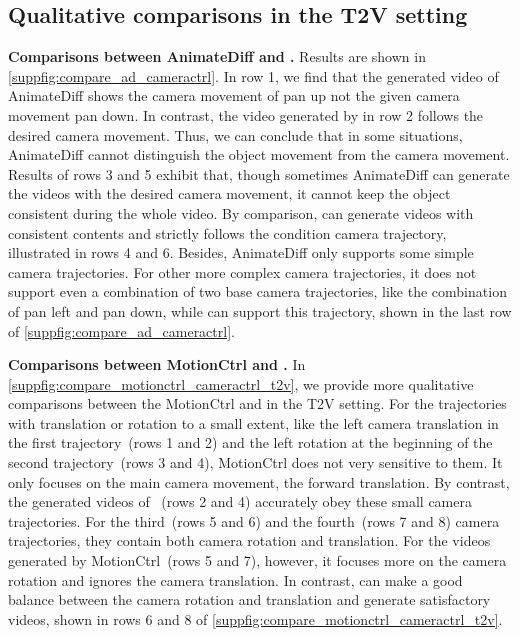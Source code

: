 \subsection{Qualitative comparisons in the T2V setting}
\label{suppsubsec:visual_comparison_t2v}
\noindent \textbf{Comparisons between AnimateDiff and \method.} Results are shown in \cref{suppfig:compare_ad_cameractrl}.
%
In row 1, we find that the generated video of AnimateDiff shows the camera movement of pan up not the given camera movement pan down.
%
In contrast, the video generated by \method in row 2 follows the desired camera movement.
%
Thus, we can conclude that in some situations, AnimateDiff cannot distinguish the object movement from the camera movement.
%
Results of rows 3 and 5 exhibit that, though sometimes AnimateDiff can generate the videos with the desired camera movement, it cannot keep the object consistent during the whole video.
%
By comparison, \method can generate videos with consistent contents and strictly follows the condition camera trajectory, illustrated in rows 4 and 6.
%
Besides, AnimateDiff only supports some simple camera trajectories.
%
For other more complex camera trajectories, it does not support even a combination of two base camera trajectories, like the combination of pan left and pan down, while \method can support this trajectory, shown in the last row of \cref{suppfig:compare_ad_cameractrl}.

\noindent\textbf{Comparisons between MotionCtrl and \method.} In \cref{suppfig:compare_motionctrl_cameractrl_t2v}, we provide more qualitative comparisons between the MotionCtrl and \method in the T2V setting. 
%
For the trajectories with translation or rotation to a small extent, like the left camera translation in the first trajectory~(rows 1 and 2) and the left rotation at the beginning of the second trajectory~(rows 3 and 4), MotionCtrl does not very sensitive to them.
%
It only focuses on the main camera movement, the forward translation.
%
By contrast, the generated videos of \method~(rows 2 and 4) accurately obey these small camera trajectories.
%
For the third~(rows 5 and 6) and the fourth~(rows 7 and 8) camera trajectories, they contain both camera rotation and translation.
%
For the videos generated by MotionCtrl~(rows 5 and 7), however, it focuses more on the camera rotation and ignores the camera translation.
%
In contrast, \method can make a good balance between the camera rotation and translation and generate satisfactory videos, shown in rows 6 and 8 of \cref{suppfig:compare_motionctrl_cameractrl_t2v}.

